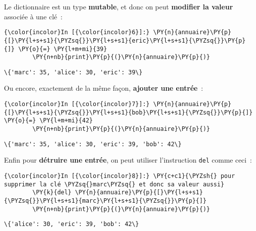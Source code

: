     Le dictionnaire est un type \textbf{mutable}, et donc on peut
\textbf{modifier la valeur} associée à une clé~:

    \begin{Verbatim}[commandchars=\\\{\}]
{\color{incolor}In [{\color{incolor}6}]:} \PY{n}{annuaire}\PY{p}{[}\PY{l+s+s1}{\PYZsq{}}\PY{l+s+s1}{eric}\PY{l+s+s1}{\PYZsq{}}\PY{p}{]} \PY{o}{=} \PY{l+m+mi}{39}
        \PY{n+nb}{print}\PY{p}{(}\PY{n}{annuaire}\PY{p}{)}
\end{Verbatim}


    \begin{Verbatim}[commandchars=\\\{\}]
\{'marc': 35, 'alice': 30, 'eric': 39\}

    \end{Verbatim}

    Ou encore, exactement de la même façon, \textbf{ajouter une entrée}~:

    \begin{Verbatim}[commandchars=\\\{\}]
{\color{incolor}In [{\color{incolor}7}]:} \PY{n}{annuaire}\PY{p}{[}\PY{l+s+s1}{\PYZsq{}}\PY{l+s+s1}{bob}\PY{l+s+s1}{\PYZsq{}}\PY{p}{]} \PY{o}{=} \PY{l+m+mi}{42}
        \PY{n+nb}{print}\PY{p}{(}\PY{n}{annuaire}\PY{p}{)}
\end{Verbatim}


    \begin{Verbatim}[commandchars=\\\{\}]
\{'marc': 35, 'alice': 30, 'eric': 39, 'bob': 42\}

    \end{Verbatim}

    Enfin pour \textbf{détruire une entrée}, on peut utiliser l'instruction
\texttt{del} comme ceci~:

    \begin{Verbatim}[commandchars=\\\{\}]
{\color{incolor}In [{\color{incolor}8}]:} \PY{c+c1}{\PYZsh{} pour supprimer la clé \PYZsq{}marc\PYZsq{} et donc sa valeur aussi}
        \PY{k}{del} \PY{n}{annuaire}\PY{p}{[}\PY{l+s+s1}{\PYZsq{}}\PY{l+s+s1}{marc}\PY{l+s+s1}{\PYZsq{}}\PY{p}{]}
        \PY{n+nb}{print}\PY{p}{(}\PY{n}{annuaire}\PY{p}{)}
\end{Verbatim}


    \begin{Verbatim}[commandchars=\\\{\}]
\{'alice': 30, 'eric': 39, 'bob': 42\}

    \end{Verbatim}

